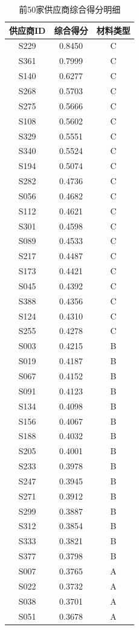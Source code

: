 \documentclass[12pt]{article}
\begin{document}
\begin{table}[htbp]
\centering
\caption{前50家供应商综合得分明细}
\label{tab:top50}
\begin{tabular}{ccc}
\toprule
供应商ID & 综合得分 & 材料类型 \\
\midrule
S229 & 0.8450 & C \\
S361 & 0.7999 & C \\
S140 & 0.6277 & C \\
S268 & 0.5703 & C \\
S275 & 0.5666 & C \\
S108 & 0.5602 & C \\
S329 & 0.5551 & C \\
S340 & 0.5524 & C \\
S194 & 0.5074 & C \\
S282 & 0.4736 & C \\
S056 & 0.4682 & C \\
S112 & 0.4621 & C \\
S301 & 0.4598 & C \\
S089 & 0.4533 & C \\
S217 & 0.4487 & C \\
S173 & 0.4421 & C \\
S045 & 0.4392 & C \\
S388 & 0.4356 & C \\
S124 & 0.4310 & C \\
S255 & 0.4278 & C \\
S003 & 0.4215 & B \\
S019 & 0.4187 & B \\
S067 & 0.4152 & B \\
S091 & 0.4123 & B \\
S134 & 0.4098 & B \\
S156 & 0.4067 & B \\
S188 & 0.4032 & B \\
S205 & 0.4001 & B \\
S233 & 0.3978 & B \\
S247 & 0.3945 & B \\
S271 & 0.3912 & B \\
S299 & 0.3887 & B \\
S312 & 0.3854 & B \\
S333 & 0.3821 & B \\
S377 & 0.3798 & B \\
S007 & 0.3765 & A \\
S022 & 0.3732 & A \\
S038 & 0.3701 & A \\
S051 & 0.3678 & A \\

\end{tabular}
\end{table}
\end{document}
